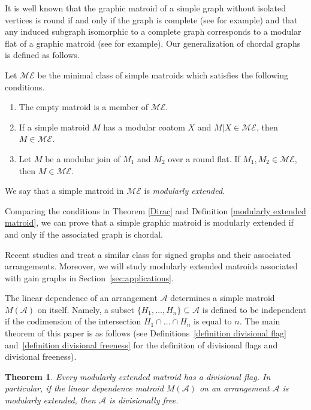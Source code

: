 \documentclass[11pt]{article}
\newtheorem{Theorem}{Theorem}[section]
\begin{document}
It is well known that the graphic matroid of a simple graph without isolated vertices is round if and only if the graph is complete (see \cite[Theorem~4.2]{borissova2016regular-etpad} for example) and that any induced subgraph isomorphic to a complete graph corresponds to a modular flat of a graphic matroid (see \cite[Proposition~6.9.11 and below]{oxley2011matroid} for example).
Our generalization of chordal graphs is defined as follows.
\begin{Definition}\label{modularly extended matroid}
Let $ \mathcal{ME} $ be the minimal class of simple matroids which satisfies the following conditions.
\begin{enumerate}[$(i)$]\itemsep=0pt
\item The empty matroid is a member of $ \mathcal{ME} $.
\item If a simple matroid $ M $ has a modular coatom $ X $ and $ M|X \in \mathcal{ME} $, then $ M \in \mathcal{ME} $.
\item Let $ M $ be a modular join of $ M_{1} $ and $ M_{2} $ over a round flat.
If $ M_{1}, M_{2} \in \mathcal{ME} $, then $ M \in \mathcal{ME} $.
\end{enumerate}
We say that a simple matroid in $ \mathcal{ME} $ is \textit{modularly extended}.
\end{Definition}

Comparing the conditions in Theorem \ref{Dirac} and Definition \ref{modularly extended matroid}, we can prove that a simple graphic matroid is modularly extended if and only if the associated graph is chordal.

Recent studies \cite{suyama2019signed-dm} and \cite{torielli2020freeness-a} treat a similar class for signed graphs and their associated arrangements.
Moreover, we will study modularly extended matroids associated with gain graphs in Section~\ref{sec:applications}.


The linear dependence of an arrangement $ \mathcal{A} $ determines a simple matroid $ M(\mathcal{A}) $ on itself.
Namely, a subset $ \{H_{1}, \dots, H_{n}\} \subseteq \mathcal{A} $ is defined to be independent if the codimension of the intersection $ H_{1} \cap \dots \cap H_{n} $ is equal to $ n $.
The main theorem of this paper is as follows (see Definitions~\ref{definition divisional flag} and~\ref{definition divisional freeness} for the definition of divisional flags and divisional freeness).
\begin{Theorem}\label{main divisionally free}
Every modularly extended matroid has a divisional flag. In particular, if the linear dependence matroid $ M(\mathcal{A}) $ on an arrangement $ \mathcal{A} $ is modularly extended, then $ \mathcal{A} $ is divisionally free.
\end{Theorem}
\end{document}
